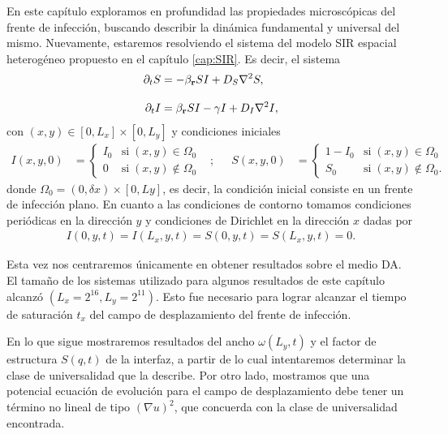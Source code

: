 \graphicspath{{figs/cap6}}


En este capítulo exploramos en profundidad las propiedades microscópicas del frente de infección, buscando describir la dinámica fundamental y universal del mismo. Nuevamente, estaremos resolviendo el sistema del modelo SIR espacial heterogéneo propuesto en el capítulo \ref{cap:SIR}. Es decir, el sistema
\begin{align}
    \partial_t S &=-\beta_{\vb r} SI + D_{S} \laplacian{S},\label{Seqdif}\\[.3cm]
    \partial_t I &=\beta_{\vb r} SI - \gamma I + D_{I} \laplacian{I},\label{Ieqdif}
\end{align}
con $(x,y) \in [0,L_x]\times[0,L_y]$ y condiciones iniciales
\begin{align*}
    I(x,y,0) &= 
    \begin{cases}
    I_0 & \text{si} \; (x,y) \in \Omega_0 \\
    0 & \text{si} \; (x,y) \notin \Omega_0  
    \end{cases}
    & ;&&
    S(x,y,0) &=
    \begin{cases}
    1-I_0 & \text{si} \; (x,y) \in \Omega_0 \\
    S_0 & \text{si} \; (x,y) \notin \Omega_0.
    \end{cases}
\end{align*}
donde $\Omega_0 = (0,\delta x) \times [0,Ly]$, es decir, la condición inicial consiste en un frente de infección plano. En cuanto a las condiciones de contorno tomamos condiciones periódicas en la dirección $y$ y condiciones de Dirichlet en la dirección $x$ dadas por
\begin{align*}
    I(0,y,t)=I(L_x,y,t)=S(0,y,t)=S(L_x,y,t)=0.
\end{align*}

Esta vez nos centraremos únicamente en obtener resultados sobre el medio DA. El tamaño de los sistemas utilizado para algunos resultados de este capítulo alcanzó $(L_x = 2^{16}, L_y =2^{11})$. Esto fue necesario para lograr alcanzar el tiempo de saturación $t_x$ del campo de desplazamiento del frente de infección.

En lo que sigue mostraremos resultados del ancho $\omega(L_y,t)$ y el factor de estructura $S(q,t)$ de la interfaz, a partir de lo cual intentaremos determinar la clase de universalidad que la describe. Por otro lado, mostramos que una potencial ecuación de evolución para el campo de desplazamiento debe tener un término no lineal de tipo $(\nabla u)^2$, que concuerda con la clase de universalidad encontrada.


